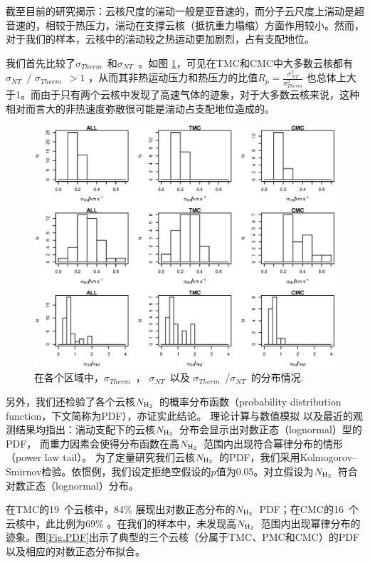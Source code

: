 \documentclass[UTF8, nocolorlinks]{pkuthss}
\newcommand{\nhyd}{$N_{\rm H_2}$\ }
\newcommand{\sigmath}{$\sigma _{Therm}$\ }
\newcommand{\sigmant}{$\sigma _{NT}$\ }
\newcommand{\numcoretmc}{19\ }
\newcommand{\numcorecmc}{16\ }
\begin{document}
		截至目前的研究揭示：云核尺度的湍动一般是亚音速的，而分子云尺度上湍动是超音速的，相较于热压力，湍动在支撑云核（抵抗重力塌缩）方面作用较小\supercite{1983ApJ...270..105M,2004A&A...416..191T}。然而，对于我们的样本，云核中的湍动较之热运动更加剧烈，占有支配地位。

		我们首先比较了\sigmath 和\sigmant 。如图 \ref{Fig.SigmaTH/SigmaNT}，可见在TMC和CMC中大多数云核都有\sigmant / \sigmath $>1$ ，从而其非热运动压力和热压力的比值$R_p=\frac{\sigma^2_{NT}}{\sigma^2_{Therm} }$ 也总体上大于1。而由于只有两个云核中发现了高速气体的迹象，对于大多数云核来说，这种相对而言大的非热速度弥散很可能是湍动占支配地位造成的。

		\begin{figure}[htbp]
		\includegraphics[totalheight=120mm]{img_plot/VelocityComparison.eps}
		\caption{在各个区域中，\sigmath ， \sigmant 以及 \sigmath/\sigmant 的分布情况.\label{Fig.SigmaTH/SigmaNT}}
		\end{figure}

		另外，我们还检验了各个云核\nhyd 的概率分布函数（probability distribution function，下文简称为PDF），亦证实此结论。
		理论计算与数值模拟\supercite{2011MNRAS.416.1436B} 以及最近的观测结果\supercite{2013ApJ...766L..17S}均指出：湍动支配下的云核\nhyd 分布会显示出对数正态（lognormal）型的PDF， 而重力因素会使得分布函数在高\nhyd 范围内出现符合幂律分布的情形（power law tail）。 
		为了定量研究我们云核\nhyd 的PDF，我们采用Kolmogorov–Smirnov检验。依惯例，我们设定拒绝空假设的$p$值为0.05。对立假设为\nhyd 符合对数正态（lognormal）分布。

		在TMC的\numcoretmc 个云核中，84\% 展现出对数正态分布的\nhyd PDF；在CMC的\numcorecmc 个云核中，此比例为69\% 。在我们的样本中，未发现高\nhyd 范围内出现幂律分布的迹象。图\ref{Fig.PDF}出示了典型的三个云核（分属于TMC、PMC和CMC）的PDF以及相应的对数正态分布拟合。
\end{document}
